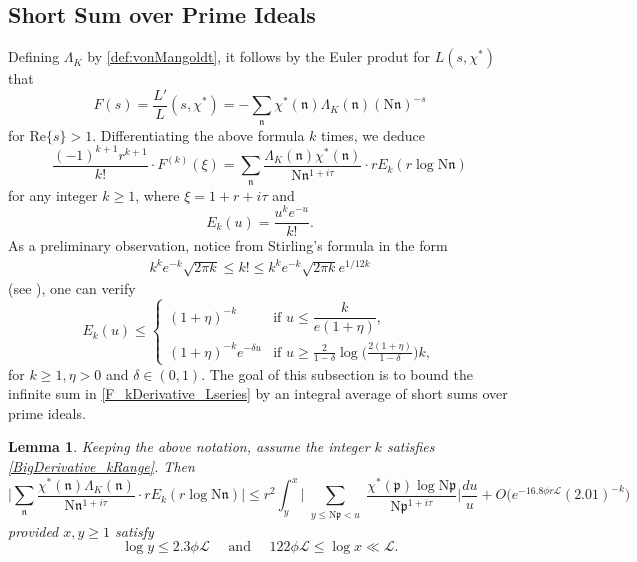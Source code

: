 \documentclass[12pt,psamsfonts]{amsart}
\newtheorem{lem}[thm]{Lemma}
\theoremstyle{definition}
\theoremstyle{remark}
\numberwithin{equation}{section}
\newcounter{notation}
\theoremstyle{plain}
\theoremstyle{remark}
\renewcommand{\1}{ {\bf 1}}
\newcommand{\cL}{\mathcal{L}}
\newcommand{\kn}{\mathfrak{n}}
\newcommand{\N}{\mathrm{N}}
\newcommand{\kp}{\mathfrak{p}}
\renewcommand{\Re}{\mathrm{Re}}
\begin{document}
\subsection{Short Sum over Prime Ideals}
Defining $\Lambda_K$ by \eqref{def:vonMangoldt}, it follows by the Euler produt for $L(s,\chi^*)$ that 
\[
F(s) = \frac{L'}{L}(s,\chi^*)  = -\sum_{\kn} \chi^*(\kn)  \Lambda_K(\kn) (\N\kn)^{-s} 
\]
for $\Re\{s\} > 1$. Differentiating the above formula $k$ times, we deduce
\begin{equation}
\frac{(-1)^{k+1} r^{k+1}}{k!} \cdot  F^{(k)}(\xi) =   \sum_{\kn} \frac{ \Lambda_K(\kn) \chi^*(\kn)}{\N\kn^{1+i\tau}}  \cdot r E_k(r \log \N\kn)
\label{F_kDerivative_Lseries}
\end{equation}
 for any integer $k \geq 1$, where $\xi = 1 + r + i\tau$ and 
\begin{equation}
 E_k(u) =  \frac{u^k e^{-u}}{k!}. 
 \label{def:E_k}
\end{equation}
As a preliminary observation, notice from Stirling's formula in the form
\begin{align*}
k^k e^{-k} \sqrt{2\pi k} \leq k! \leq k^k e^{-k} \sqrt{2\pi k} e^{1/12k}
\end{align*}
(see \cite{DLMF}), one can verify
\begin{equation}
E_k(u) \leq 
\begin{cases}
(1+\eta)^{-k} & \text{if $u \leq \dfrac{k}{e(1+\eta)}$}, \\
(1+\eta)^{-k} e^{-\delta u} & \text{if $u \geq \tfrac{2}{1-\delta} \log\big( \tfrac{2(1+\eta)}{1-\delta} \big) k$},
\end{cases}
\label{E_k-Bounds}
\end{equation}
for $k \geq 1, \eta > 0$ and $\delta \in (0,1)$. The goal of this subsection is to bound the infinite sum in \eqref{F_kDerivative_Lseries} by an integral average of short sums over prime ideals. 
\begin{lem} \label{ShortPrimeSum} Keeping the above notation, assume the integer $k$ satisfies \eqref{BigDerivative_kRange}. Then 
\[
\Big| \sum_{\kn} \frac{\chi^*(\kn) \Lambda_K(\kn)}{\N\kn^{1+i\tau}}  \cdot r E_k(r \log \N\kn) \Big| \leq  r^2 \int_y^x \Big| \sum_{\substack{y \leq \N\kp < u}} \frac{\chi^*(\kp) \log \N \kp  }{\N\kp^{1+i\tau}}  \Big| \frac{du}{u} + O\big( e^{-16.8 \phi r \cL} (2.01)^{-k} \big)
 \]
 provided $x,y \geq 1$ satisfy
 \begin{equation}
\log y \leq 2.3 \phi \cL \quad \text{ and } \quad 122\phi \cL \leq  \log x \ll \cL.  
\label{ShortPrimeSum_Range}
 \end{equation}
 \end{lem}
\end{document}
